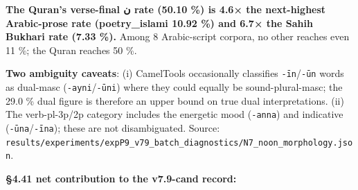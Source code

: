 \documentclass[
]{article}
\begin{document}
\textbf{The Quran's verse-final ن rate (50.10 \%) is 4.6× the
next-highest Arabic-prose rate (poetry\_islami 10.92 \%) and 6.7× the
Sahih Bukhari rate (7.33 \%).} Among 8 Arabic-script corpora, no other
reaches even 11 \%; the Quran reaches 50 \%.

\textbf{Two ambiguity caveats}: (i) CamelTools occasionally classifies
\texttt{-īn}/\texttt{-ūn} words as dual-masc
(\texttt{-ayni}/\texttt{-ūni}) where they could equally be
sound-plural-masc; the 29.0 \% dual figure is therefore an upper bound
on true dual interpretations. (ii) The verb-pl-3p/2p category includes
the energetic mood (\texttt{-anna}) and indicative
(\texttt{-ūna}/\texttt{-īna}); these are not disambiguated. Source:
\texttt{results/experiments/expP9\_v79\_batch\_diagnostics/N7\_noon\_morphology.json}.

\textbf{§4.41 net contribution to the v7.9-cand record:}
\end{document}
